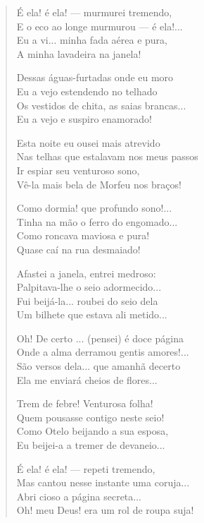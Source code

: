 \documentclass[12pt]{book}
\begin{document}
					\begin{verse}
						É ela! é ela! — murmurei tremendo, \\
						E o eco ao longe murmurou — é ela!... \\
						Eu a vi... minha fada aérea e pura, \\
						A minha lavadeira na janela!
						
						Dessas águas-furtadas onde eu moro \\
						Eu a vejo estendendo no telhado \\
						Os vestidos de chita, as saias brancas... \\
						Eu a vejo e suspiro enamorado!
						
						Esta noite eu ousei mais atrevido \\
						Nas telhas que estalavam nos meus passos \\
						Ir espiar seu venturoso sono, \\
						Vê-la mais bela de Morfeu nos braços!
						
						Como dormia! que profundo sono!... \\
						Tinha na mão o ferro do engomado... \\
						Como roncava maviosa e pura! \\
						Quase caí na rua desmaiado!
						
						Afastei a janela, entrei medroso: \\
						Palpitava-lhe o seio adormecido... \\
						Fui beijá-la... roubei do seio dela \\
						Um bilhete que estava ali metido...
						
						Oh! De certo ... (pensei) é doce página \\
						Onde a alma derramou gentis amores!... \\
						São versos dela... que amanhã decerto \\
						Ela me enviará cheios de flores...
						
						Trem de febre! Venturosa folha! \\
						Quem pousasse contigo neste seio! \\
						Como Otelo beijando a sua esposa, \\
						Eu beijei-a a tremer de devaneio...
						
						É ela! é ela! — repeti tremendo, \\
						Mas cantou nesse instante uma coruja... \\
						Abri cioso a página secreta... \\
						Oh! meu Deus! era um rol de roupa suja!
						

\end{verse}
\end{document}

